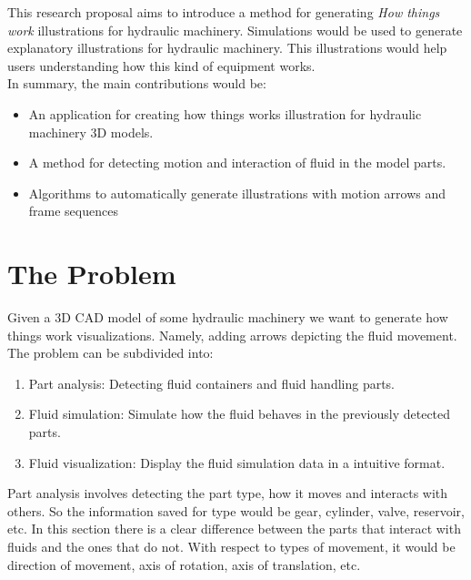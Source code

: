 \documentclass[11pt]{report}
\begin{document}
This research proposal aims to introduce a method for generating \textit{How things work} illustrations for hydraulic machinery.
Simulations would be used to generate explanatory illustrations for hydraulic machinery.
This illustrations would help users understanding how this kind of equipment works.\\

In summary, the main contributions would be:
\begin{itemize}
\item An application for creating how things works illustration for hydraulic machinery 3D models.
\item A method for detecting motion and interaction of fluid in the model parts.
\item Algorithms to automatically generate illustrations with motion arrows and frame sequences
\end{itemize}


\section{The Problem}
\label{sec:problem}

Given a 3D CAD model of some hydraulic machinery we want to generate how things work visualizations.
Namely, adding arrows depicting the fluid movement.\\

The problem can be subdivided into:
\begin{enumerate}
\item Part analysis: Detecting fluid containers and fluid handling parts.
\item Fluid simulation: Simulate how the fluid behaves in the previously detected parts.
\item Fluid visualization: Display the fluid simulation data in a intuitive format.\\
\end{enumerate}

Part analysis involves detecting the part type, how it moves and interacts with others.
So the information saved for type would be gear, cylinder, valve, reservoir, etc.
In this section there is a clear difference between the parts that interact with fluids and the ones that do not. 
With respect to types of movement, it would be direction of movement, axis of rotation, axis of translation, etc.\\
\end{document}
